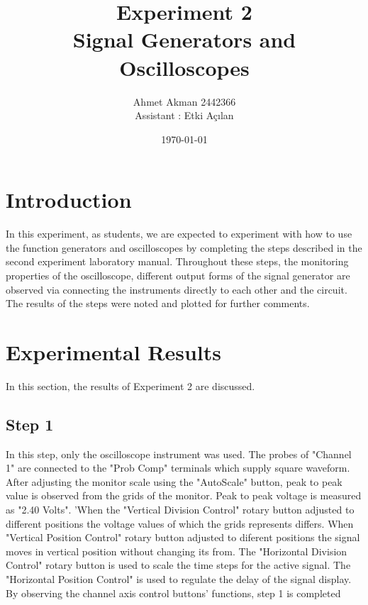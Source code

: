 \documentclass[letterpaper,12pt]{article}
\begin{document}
\title{Experiment 2 \protect\\Signal Generators and Oscilloscopes}
\author{Ahmet Akman 2442366 \protect\\ Assistant : Etki Açılan}
\date{\today}
\maketitle



\section{Introduction} 
In this experiment, as students, we are expected to experiment with how to use the function generators and oscilloscopes by completing the steps described in the second experiment laboratory manual. Throughout these steps, the monitoring properties of the oscilloscope, different output forms of the signal generator are observed via connecting the instruments directly to each other and the circuit. The results of the steps were noted and plotted for further comments.

\section{Experimental Results}
In this section, the results of Experiment 2 are discussed.
\subsection{Step 1}
In this step, only the oscilloscope instrument was used. The probes of "Channel 1" are connected to the "Prob Comp" terminals which supply square waveform. After adjusting the monitor scale using the "AutoScale" button, peak to peak value is observed from the grids of the monitor. Peak to peak voltage is measured as "2.40 Volts". 'When the "Vertical Division Control" rotary button adjusted to different positions the voltage values of which the grids represents differs. When "Vertical Position Control" rotary button adjusted to diferent positions the signal moves in vertical position without changing its from. The "Horizontal Division Control" rotary button is used to scale the time steps for the active signal. The "Horizontal Position Control" is used to regulate the delay of the signal display. By observing the channel axis control buttons' functions, step 1 is completed
\end{document}
